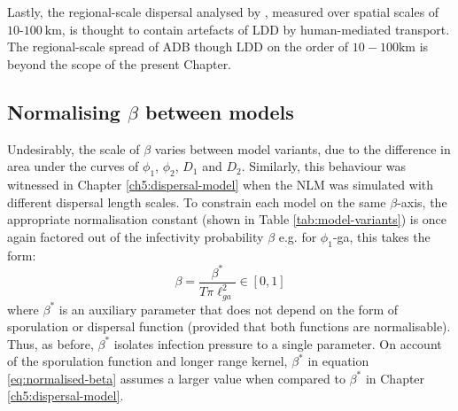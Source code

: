 Lastly, the regional-scale dispersal analysed by \cite{grosdidier2018tracking}, measured over spatial scales of $10$-$100\ \mathrm{km}$, is thought to contain artefacts of LDD by human-mediated transport.
The regional-scale spread of ADB though LDD on the order of $10-100\mathrm{km}$ is beyond the scope of the present Chapter.

\subsection{Normalising $\beta$ between models}

Undesirably, the scale of $\beta$ varies between model variants, due to the difference in area under the curves of $\phi_1$, $\phi_2$, $D_1$ and $D_2$.
Similarly, this behaviour was witnessed in Chapter \ref{ch5:dispersal-model} when the NLM was simulated with different dispersal length scales.
To constrain each model on the same $\beta$-axis, the appropriate normalisation constant (shown in Table \ref{tab:model-variants}) is once again factored out of the infectivity probability $\beta$ 
e.g. for $\phi_1$-ga, this takes the form: 
\begin{equation}
    \beta = \frac{\beta^*}{T \pi \ell^2_{ga}} \in [0, 1]
\label{eq:normalised-beta}
\end{equation}
where $\beta^*$ is an auxiliary parameter that does not depend on the form of sporulation or dispersal function (provided that both functions are normalisable).
Thus, as before, $\beta^*$ isolates infection pressure to a single parameter.
On account of the sporulation function and longer range kernel, $\beta^*$ in equation \ref{eq:normalised-beta} assumes a larger value when compared to $\beta^*$ in Chapter \ref{ch5:dispersal-model}.


